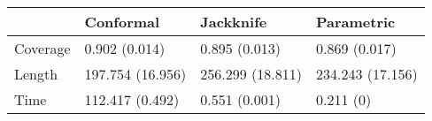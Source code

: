 \begin{tabular}{|l|l|l|l|}
\hline
& Conformal & Jackknife & Parametric \\
\hline
Coverage & 0.902 (0.014) & 0.895 (0.013) & 0.869 (0.017) \\
\hline
Length & 197.754 (16.956) & 256.299 (18.811) & 234.243 (17.156) \\
\hline
Time & 112.417 (0.492) & 0.551 (0.001) & 0.211 (0) \\
\hline
\end{tabular}
